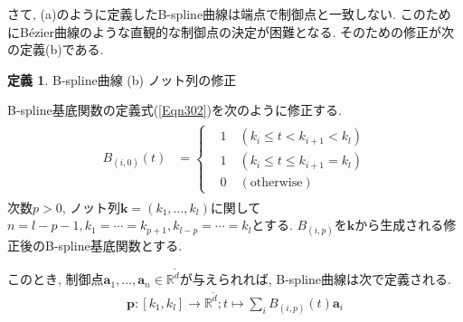 \documentclass{jsarticle}
\newcommand\setR{\mathbb{R}}
\theoremstyle{definition}%
\newtheorem{defn}[thm]{定義}
\begin{document}
\newpage
さて, (a)のように定義したB-spline曲線は端点で制御点と一致しない.
このためにB\'{e}zier曲線のような直観的な制御点の決定が困難となる.
そのための修正が次の定義(b)である.
\begin{screen}
	\begin{defn}
        \label{Def300b}
		B-spline曲線 (b) ノット列の修正

        B-spline基底関数の定義式(\ref{Eqn302})を次のように修正する.
        \begin{align}
            \label{Eqn310}
            \begin{aligned}
                {B}_{(i,0)} (t)
                &=
                \begin{cases}
                    &1\quad (k_{i}\le t<k_{i+1}<k_{l})\\
                    &1\quad (k_{i}\le t\le k_{i+1}=k_{l})\\
                    &0\quad (\text{otherwise})
                \end{cases}
            \end{aligned}
        \end{align}
        次数$p>0$, ノット列$\bm{k}=(k_1,\dots,k_l)$に関して$n=l-p-1, k_{1}=\cdots=k_{p+1}, k_{l-p}=\cdots=k_{l}$とする.
        $B_{(i,p)}$を$\bm{k}$から生成される修正後のB-spline基底関数とする.

        このとき, 制御点$\bm{a}_1, \dots, \bm{a}_n\in \setR^{\tilde{d}}$が与えられれば, B-spline曲線は次で定義される.
		\begin{align}
			\bm{p}:[k_{1},k_{l}]\to \setR^{\tilde{d}};t\mapsto\sum_i B_{(i,p)}(t) \bm{a}_i
		\end{align}
	\end{defn}
\end{screen}
\end{document}
